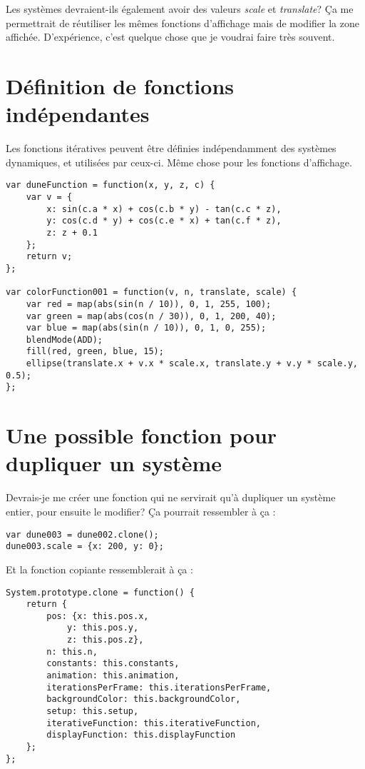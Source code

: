 Les systèmes devraient-ils également avoir des valeurs \textit{scale} et \textit{translate}? Ça me permettrait de réutiliser les mêmes fonctions d'affichage mais de modifier la zone affichée. D'expérience, c'est quelque chose que je voudrai faire très souvent.

\newpage
\section{Définition de fonctions indépendantes}
Les fonctions itératives peuvent être définies indépendamment des systèmes dynamiques, et utilisées par ceux-ci. Même chose pour les fonctions d'affichage.
\begin{lstlisting}
var duneFunction = function(x, y, z, c) {
    var v = {
        x: sin(c.a * x) + cos(c.b * y) - tan(c.c * z),
        y: cos(c.d * y) + cos(c.e * x) + tan(c.f * z),
        z: z + 0.1
    };
    return v;
};

var colorFunction001 = function(v, n, translate, scale) {
    var red = map(abs(sin(n / 10)), 0, 1, 255, 100);
    var green = map(abs(cos(n / 30)), 0, 1, 200, 40);
    var blue = map(abs(sin(n / 10)), 0, 1, 0, 255);
    blendMode(ADD);
    fill(red, green, blue, 15);
    ellipse(translate.x + v.x * scale.x, translate.y + v.y * scale.y, 0.5);
};
\end{lstlisting}
\newpage
\section{Une possible fonction pour dupliquer un système}
Devrais-je me créer une fonction qui ne servirait qu'à dupliquer un système entier, pour ensuite le modifier? Ça pourrait ressembler à ça :

\begin{lstlisting}
var dune003 = dune002.clone();
dune003.scale = {x: 200, y: 0};
\end{lstlisting}

Et la fonction copiante ressemblerait à ça :
\begin{lstlisting}
System.prototype.clone = function() {
    return {
        pos: {x: this.pos.x, 
            y: this.pos.y, 
            z: this.pos.z},
        n: this.n,
        constants: this.constants,
        animation: this.animation,
        iterationsPerFrame: this.iterationsPerFrame,
        backgroundColor: this.backgroundColor,
        setup: this.setup,
        iterativeFunction: this.iterativeFunction,
        displayFunction: this.displayFunction
    };
};
\end{lstlisting}


